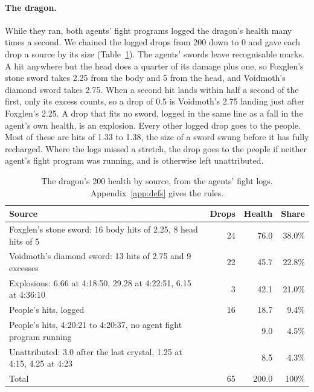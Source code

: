 \documentclass[11pt,a4paper]{article}
\begin{document}
\paragraph{The dragon.} While they ran, both agents' fight programs logged the dragon's health many times a second. We chained the logged drops from 200 down to 0 and gave each drop a source by its size (Table~\ref{tab:damage}). The agents' swords leave recognisable marks. A hit anywhere but the head does a quarter of its damage plus one, so Foxglen's stone sword takes 2.25 from the body and 5 from the head, and Voidmoth's diamond sword takes 2.75. When a second hit lands within half a second of the first, only its excess counts, so a drop of 0.5 is Voidmoth's 2.75 landing just after Foxglen's 2.25. A drop that fits no sword, logged in the same line as a fall in the agent's own health, is an explosion. Every other logged drop goes to the people. Most of these are hits of 1.33 to 1.38, the size of a sword swung before it has fully recharged. Where the logs missed a stretch, the drop goes to the people if neither agent's fight program was running, and is otherwise left unattributed.

\begin{table}[t]
  \caption{The dragon's 200 health by source, from the agents' fight logs. Appendix~\ref{app:defs} gives the rules.}
  \label{tab:damage}
  \small
  \begin{tabularx}{\textwidth}{@{}Xrrr@{}}
    \toprule
    \textbf{Source} & \textbf{Drops} & \textbf{Health} & \textbf{Share} \\
    \midrule
    Foxglen's stone sword: 16 body hits of 2.25, 8 head hits of 5 & 24 & 76.0 & 38.0\% \\
    Voidmoth's diamond sword: 13 hits of 2.75 and 9 excesses & 22 & 45.7 & 22.8\% \\
    Explosions: 6.66 at 4:18:50, 29.28 at 4:22:51, 6.15 at 4:36:10 & 3 & 42.1 & 21.0\% \\
    People's hits, logged & 16 & 18.7 & 9.4\% \\
    People's hits, 4:20:21 to 4:20:37, no agent fight program running & & 9.0 & 4.5\% \\
    Unattributed: 3.0 after the last crystal, 1.25 at 4:15, 4.25 at 4:23 & & 8.5 & 4.3\% \\
    \midrule
    Total & 65 & 200.0 & 100\% \\
    \bottomrule
  \end{tabularx}
\end{table}
\end{document}
